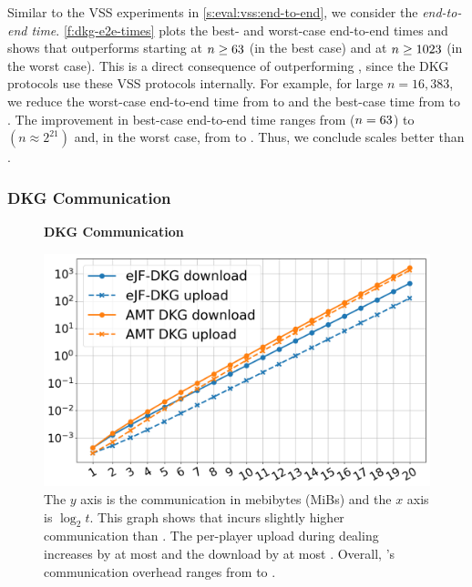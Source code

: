 Similar to the VSS experiments in \cref{s:eval:vss:end-to-end}, we consider the \textit{end-to-end time}.
\cref{f:dkg-e2e-times} plots the best- and worst-case end-to-end times and shows that \ourdkg outperforms \ejfdkg starting at $n\ge 63$ (in the best case) and at $n\ge1023$ (in the worst case).
This is a direct consequence of \ourvss outperforming \evss, since the DKG protocols use these VSS protocols internally.
For example, for large $n=16,383$, we reduce the worst-case end-to-end time from  to  and the best-case time from  to .
The improvement in best-case end-to-end time ranges from \amtDkgEndToEndBcTimeImprovOverejf{\dkgOutperformBcN} ($n=63$) to  $(n\approx2^{21})$ and, in the worst case, from \amtDkgEndToEndWcTimeImprovOverejf{\dkgOutperformWcN} to .
Thus, we conclude \ourdkg scales better than \ejfdkg.

\subsubsection{DKG Communication}
\label{s:eval:dkg:communication}

\begin{figure}[t]
    \centering
    \textbf{DKG Communication}\par\medskip
    \includegraphics[width=0.70\columnwidth]{figures-thresh/bw.png}
    \caption{
        The $y$ axis is the communication in mebibytes (MiBs) and the $x$ axis is $\log_2{t}$.
        This graph shows that \ourdkg incurs slightly higher communication than \ejfdkg.
        The per-player upload during dealing increases by at most \protect {} and the download by at most \protect {}.
        Overall, \ourdkg's communication overhead ranges from \protect {} to \protect {}.
    }
    \label{f:dkg-bw}
\end{figure}

